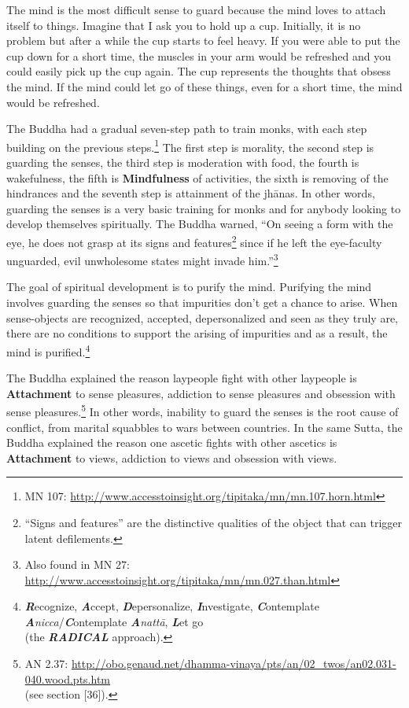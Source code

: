 The mind is the most difficult sense to guard because the mind loves to attach itself to things. Imagine that I ask you to hold up a cup. Initially, it is no problem but after a while the cup starts to feel heavy. If you were able to put the cup down for a short time, the muscles in your arm would be refreshed and you could easily pick up the cup again. The cup represents the thoughts that obsess the mind. If the mind could let go of these things, even for a short time, the mind would be refreshed.

The Buddha had a gradual seven-step path to train monks, with each step building on the previous steps.\footnote{MN 107: \url{http://www.accesstoinsight.org/tipitaka/mn/mn.107.horn.html}} The first step is morality, the second step is guarding the senses, the third step is moderation with food, the fourth is wakefulness, the fifth is \textbf{Mindfulness} of activities, the sixth is removing of the hindrances and the seventh step is attainment of the jhānas. In other words, guarding the senses is a very basic training for monks and for anybody looking to develop themselves spiritually. The Buddha warned, “On seeing a form with the eye, he does not grasp at its signs and features\footnote{“Signs and features” are the distinctive qualities of the object that can trigger latent defilements.} since if he left the eye-faculty unguarded, evil unwholesome states might invade him.”\footnote{Also found in MN 27: \url{http://www.accesstoinsight.org/tipitaka/mn/mn.027.than.html}}

\pagebreak

The goal of spiritual development is to purify the mind. Purifying the mind involves guarding the senses so that impurities don’t get a chance to arise. When sense-objects are recognized, accepted, depersonalized and seen as they truly are, there are no conditions to support the arising of impurities and as a result, the mind is purified.\footnote{\textit{\textbf{R}}ecognize, \textbf{\textit{A}}ccept, \textit{\textbf{D}}epersonalize, \textbf{\textit{I}}nvestigate, \textit{\textbf{C}}ontemplate \textbf{\textit{A}}\textit{nicca}/\textit{\textbf{C}}ontemplate \textbf{\textit{A}}\textit{nattā}, \textbf{\textit{L}}et go \\(the \textit{\textbf{RADICAL}} approach).}

The Buddha explained the reason laypeople fight with other laypeople is \textbf{Attachment} to sense pleasures, addiction to sense pleasures and obsession with sense pleasures.\footnote{AN 2.37: \url{http://obo.genaud.net/dhamma-vinaya/pts/an/02_twos/an02.031-040.wood.pts.htm}\\(see section [36]).} In other words, inability to guard the senses is the root cause of conflict, from marital squabbles to wars between countries. In the same Sutta, the Buddha explained the reason one ascetic fights with other ascetics is \textbf{Attachment} to views, addiction to views and obsession with views.

